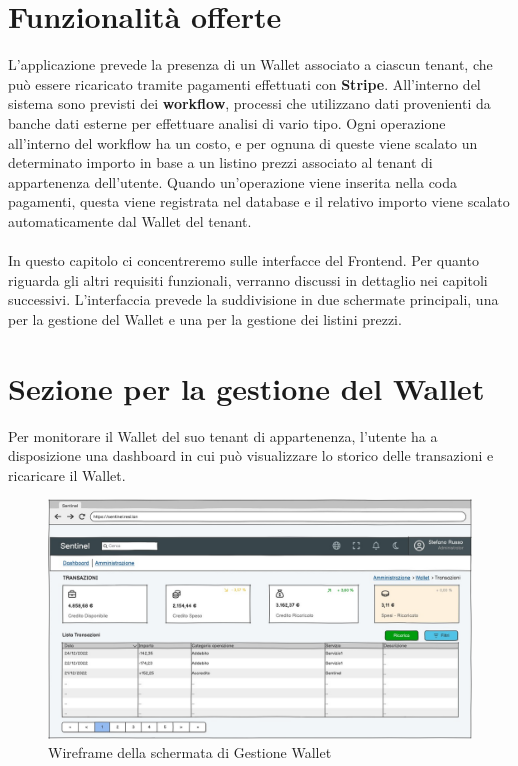 \section{Funzionalit\`a offerte}
L'applicazione prevede la presenza di un Wallet associato a ciascun tenant, che pu\`o essere ricaricato tramite pagamenti effettuati con \textbf{Stripe}.
All'interno del sistema sono previsti dei \textbf{workflow}, processi che utilizzano dati provenienti da banche dati esterne per effettuare analisi di vario tipo.
Ogni operazione all'interno del workflow ha un costo, e per ognuna di queste viene scalato un determinato importo in base a un listino prezzi associato al tenant di appartenenza dell'utente.
Quando un'operazione viene inserita nella coda pagamenti, questa viene registrata nel database e il relativo importo viene scalato automaticamente dal Wallet del tenant.
\\\\
In questo capitolo ci concentreremo sulle interfacce del Frontend. Per quanto riguarda gli altri requisiti funzionali, verranno discussi in dettaglio nei capitoli successivi.
L'interfaccia prevede la suddivisione in due schermate principali, una per la gestione del Wallet e una per la gestione dei listini prezzi.

\section{Sezione per la gestione del Wallet}
Per monitorare il Wallet del suo tenant di appartenenza, l'utente ha a disposizione una dashboard in cui pu\`o visualizzare lo storico delle transazioni e ricaricare il Wallet.

\begin{figure}[H]
  \centering
  \includegraphics[width=14cm]{images/gestione-wallet/mock-gestione-wallet.png}
  \caption{Wireframe della schermata di Gestione Wallet}
\end{figure}

